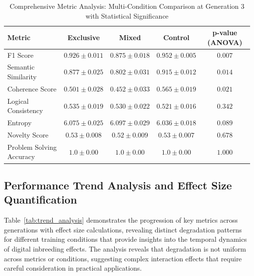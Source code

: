 \documentclass{article}
\begin{document}
\begin{table}[h]
\centering
\caption{Comprehensive Metric Analysis: Multi-Condition Comparison at Generation 3 with Statistical Significance}
\label{tab:comprehensive_metrics}
\begin{tabular}{lcccc}
\toprule
\textbf{Metric} & \textbf{Exclusive} & \textbf{Mixed} & \textbf{Control} & \textbf{p-value (ANOVA)} \\
\midrule
F1 Score & $0.926 \pm 0.011$ & $\mathbf{0.875 \pm 0.018}$ & $0.952 \pm 0.005$ & $\mathbf{0.007}$ \\
Semantic Similarity & $0.877 \pm 0.025$ & $0.802 \pm 0.031$ & $0.915 \pm 0.012$ & $\mathbf{0.014}$ \\
Coherence Score & $0.501 \pm 0.028$ & $0.452 \pm 0.033$ & $0.565 \pm 0.019$ & $\mathbf{0.021}$ \\
Logical Consistency & $0.535 \pm 0.019$ & $0.530 \pm 0.022$ & $0.521 \pm 0.016$ & $0.342$ \\
Entropy & $6.075 \pm 0.025$ & $6.097 \pm 0.029$ & $6.036 \pm 0.018$ & $0.089$ \\
Novelty Score & $0.53 \pm 0.008$ & $0.52 \pm 0.009$ & $0.53 \pm 0.007$ & $0.678$ \\
Problem Solving Accuracy & $1.0 \pm 0.00$ & $1.0 \pm 0.00$ & $1.0 \pm 0.00$ & $1.000$ \\
\bottomrule
\end{tabular}
\end{table}

\subsection{Performance Trend Analysis and Effect Size Quantification}

Table~\ref{tab:trend_analysis} demonstrates the progression of key metrics across generations with effect size calculations, revealing distinct degradation patterns for different training conditions that provide insights into the temporal dynamics of digital inbreeding effects. The analysis reveals that degradation is not uniform across metrics or conditions, suggesting complex interaction effects that require careful consideration in practical applications.
\end{document}
